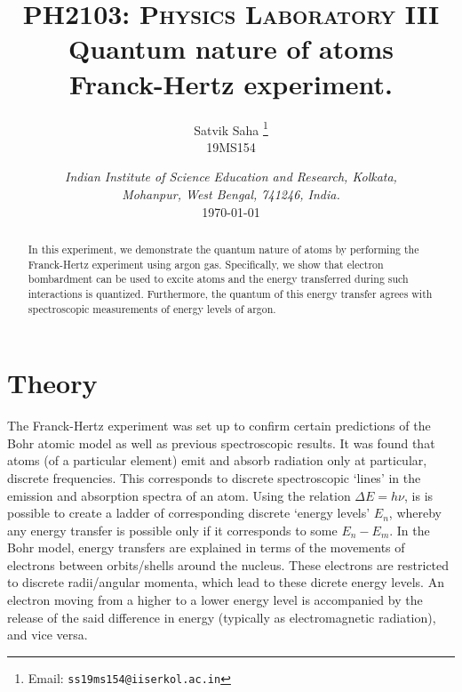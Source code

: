 \documentclass[11pt]{article}
\title{
        \Large\textsc{PH2103: Physics Laboratory III} \\
        \vspace{10pt}
        \Huge \textbf{Quantum nature of atoms} \\
        \vspace{5pt}
        \large{Franck-Hertz experiment.}
}
\author{
        \large Satvik Saha%
        \thanks{Email: \tt ss19ms154@iiserkol.ac.in}
        \\\textsc{\small 19MS154}
}
\date{\normalsize
        \textit{Indian Institute of Science Education and Research, Kolkata, \\
        Mohanpur, West Bengal, 741246, India.} \\
        \vspace{10pt}
        \today
}
\begin{document}
        \maketitle

        \begin{abstract}
                In this experiment, we demonstrate the quantum nature of atoms by performing the Franck-Hertz experiment
                using argon gas. Specifically, we show that electron bombardment can be used to excite atoms and the energy
                transferred during such interactions is quantized. Furthermore, the quantum of this energy transfer agrees with
                spectroscopic measurements of energy levels of argon.
        \end{abstract}

        \section{Theory}
        The Franck-Hertz experiment was set up to confirm certain predictions of the Bohr atomic model as well as previous spectroscopic results.
        It was found that atoms (of a particular element) emit and absorb radiation only at particular, discrete frequencies.
        This corresponds to discrete spectroscopic `lines' in the emission and absorption spectra of an atom.
        Using the relation $\Delta E = h\nu$, is is possible to create a ladder of corresponding discrete `energy levels' $E_n$, whereby any energy transfer
        is possible only if it corresponds to some $E_n - E_m$. In the Bohr model, energy transfers are explained in terms of the movements of 
        electrons between orbits/shells around the nucleus. These electrons are restricted to discrete radii/angular momenta, which
        lead to these dicrete energy levels. An electron moving from a higher to a lower energy level is accompanied by the release of
        the said difference in energy (typically as electromagnetic radiation), and vice versa.
\end{document}
